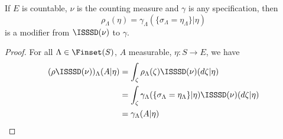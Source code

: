 



\begin{lemma}
    \label{lem:exists-modif-isssd}

    If $E$ is countable, $\nu$ is the counting measure and $\gamma$ is any specification, then
    $$\rho_\Lambda(\eta) = \gamma_\Lambda(\{\sigma_\Lambda = \eta_\Lambda\} | \eta)$$
    is a modifier from $\ISSSD(\nu)$ to $\gamma$.
\end{lemma}
\begin{proof}

    For all $\Lambda \in \Finset(S)$, $A$ measurable, $\eta : S \to E$, we have
    \begin{align}
        (\rho\ISSSD(\nu))_\Lambda(A|\eta)
        & = \int_\zeta \rho_\Lambda(\zeta) \ISSSD(\nu)(d\zeta|\eta) \\
        & = \int_\zeta \gamma_\Lambda(\{\sigma_\Lambda = \eta_\Lambda\} | \eta) \ISSSD(\nu)(d\zeta|\eta) \\
        & = \gamma_\Lambda(A|\eta)
    \end{align}
\end{proof}

